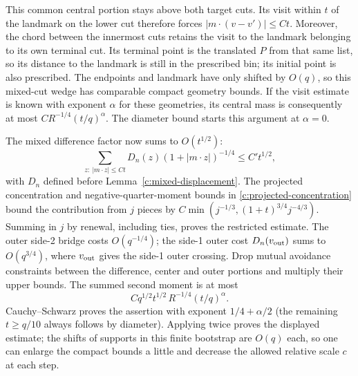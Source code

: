 This common central portion stays above both target cuts. Its visit
within \(t\) of the landmark on the lower cut therefore forces
\(|m\cdot(v-v')|\le Ct\). Moreover, the chord between the innermost
cuts retains the visit to the landmark belonging to its own terminal
cut. Its terminal point is the translated \(P\) from that same list,
so its distance to the landmark is still in the prescribed bin; its
initial point is also prescribed. The endpoints and landmark have
only shifted by \(O(q)\), so this mixed-cut wedge has comparable compact
geometry bounds. If the visit estimate is known with exponent
\(\alpha\) for these geometries, its central mass is consequently at
most \(CR^{-1/4}(t/q)^\alpha\). The diameter bound starts this argument
at \(\alpha=0\).



The mixed difference factor now sums to \(O(t^{1/2})\):
\[
 \sum_{z:\ |m\cdot z|\le C t}D_n(z)(1+|m\cdot z|)^{-1/4}\le C' t^{1/2},
\]
with \(D_n\) defined before Lemma~\ref{c:mixed-displacement}. The
projected concentration and negative-quarter-moment bounds in
\eqref{c:projected-concentration} bound the contribution from \(j\)
pieces by
\(C\min(j^{-1/3},(1+t)^{3/4}j^{-4/3})\).
Summing in \(j\) by renewal, including ties, proves the restricted
estimate. The outer side-2 bridge costs \(O(q^{-1/4})\); the side-1
outer cost \(D_n(v_{\rm out})\) sums to \(O(q^{3/4})\), where
\(v_{\rm out}\) gives the side-1 outer crossing. Drop mutual avoidance
constraints between the difference, center and outer portions and
multiply their upper bounds. The summed second moment is at most
\[
 C q^{1/2}t^{1/2}\,R^{-1/4}(t/q)^\alpha .
\]
Cauchy--Schwarz proves the assertion with exponent \(1/4+\alpha/2\) (the remaining \(t\ge q/10\) always follows by diameter). Applying twice proves the displayed estimate; the shifts of supports in this finite bootstrap are \(O(q)\) each, so one can enlarge the compact bounds a little and decrease the allowed relative scale \(c\) at each step.



